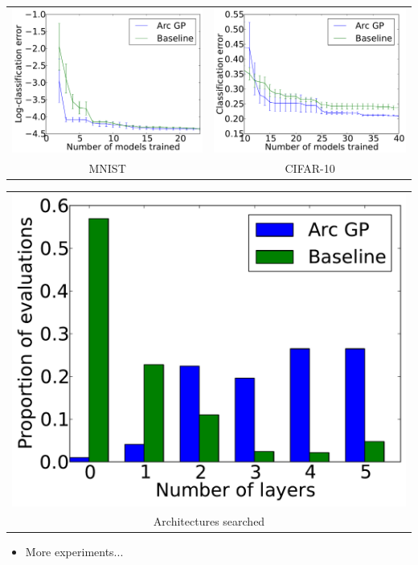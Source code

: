 \documentclass[landscape,a0b,final,a4resizeable]{include/a0poster}
\begin{document}
\begin{poster}
\begin{multicols}{3}
	\centering
\begin{tabular}{cc}
\includegraphics[width=0.45\columnwidth]{figures/mnist.pdf} &
\includegraphics[width=0.45\columnwidth]{figures/cifar10.pdf} \\
MNIST &  CIFAR-10
\end{tabular}		


\begin{tabular}{c}
		\includegraphics[width=0.45\columnwidth]{figures/fevals_per_layer.pdf} \\
Architectures searched
\end{tabular}
		



	\begin{itemize}
		\item More experiments...
	\end{itemize}


\end{multicols}
\end{poster}
\end{document}
